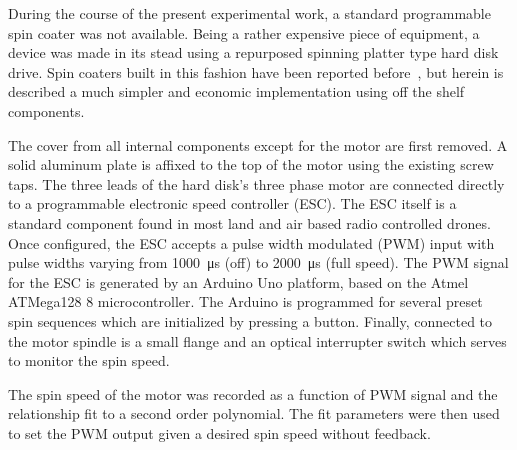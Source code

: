 During the course of the present experimental work, a standard programmable
spin coater was not available.  Being a rather expensive piece of
equipment, a device was made in its stead using a repurposed spinning
platter type hard disk drive.  Spin coaters built in this fashion have been
reported before~\cite{bianchi2006spin}, but herein is described a much
simpler and economic implementation using off the shelf components.

The cover from all internal components except for the motor are first
removed.  A solid aluminum plate is affixed to the top of the motor using
the existing screw taps.  The three leads of the hard disk's three phase
motor are connected directly to a programmable electronic speed controller
(ESC).  The ESC itself is a standard component found in most land and air
based radio controlled drones.  Once configured, the ESC accepts a pulse
width modulated (PWM) input with pulse widths varying from
\SI{1000}{\micro\second} (off) to \SI{2000}{\micro\second} (full speed).
The PWM signal for the ESC is generated by an Arduino Uno platform, based
on the Atmel ATMega128 \SI{8}{\bit} microcontroller.  The Arduino is
programmed for several preset spin sequences which are initialized by
pressing a button.  Finally, connected to the motor spindle is a small
flange and an optical interrupter switch which serves to monitor the spin
speed.  

The spin speed of the motor was recorded as a function of PWM signal and
the relationship fit to a second order polynomial.  The fit parameters were
then used to set the PWM output given a desired spin speed without
feedback.

